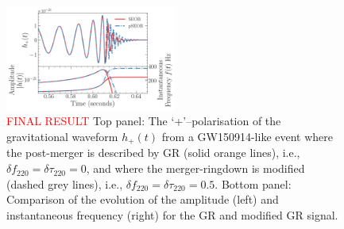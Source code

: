 \documentclass[twocolumn,prd,superscriptaddress,amsfonts,amssymb,amsmath,preprintnumbers]{revtex4-1}
\newcommand{\df}[1]{\delta f_{\text{#1}}}
\newcommand{\dtau}[1]{\delta \tau_{\text{#1}}}
\begin{document}
\begin{figure}
	\includegraphics[width=0.5\textwidth]{figures/modGR_waveforms_amplitudephase.png}
	\caption{\textcolor{red}{FINAL RESULT} Top panel: The `+'--polarisation of the gravitational waveform $h_+(t)$ from a GW150914-like event where the post-merger is described by GR (solid orange lines), i.e., $\df{220} = \dtau{220} = 0$, and where the merger-ringdown is modified (dashed grey lines), i.e., $\df{220} = \dtau{220} = 0.5$. Bottom panel: Comparison of the evolution of the amplitude (left) and instantaneous frequency (right) for the GR and modified GR signal.}
	\label{fig:nongr_waveform}
\end{figure}
\end{document}
